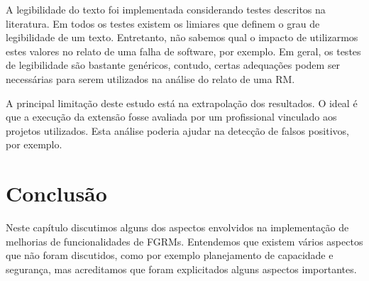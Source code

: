 A legibilidade do texto foi implementada considerando testes descritos na
literatura. Em todos os testes existem os limiares que definem o grau de
legibilidade de um texto. Entretanto, não sabemos qual o impacto de utilizarmos
estes valores no relato de uma falha de software, por exemplo. Em geral, os
testes de legibilidade são bastante genéricos, contudo, certas adequações podem
ser necessárias para serem utilizados na análise do relato de uma RM\@.

A principal limitação deste estudo está na extrapolação dos resultados. O ideal
é que a execução da extensão fosse avaliada por um profissional vinculado aos
projetos utilizados. Esta análise poderia ajudar na detecção de falsos
positivos, por exemplo.


\section{Conclusão}
\label{sec:implementacao_extensao_conclusao}

Neste capítulo discutimos alguns dos aspectos envolvidos na implementação de
melhorias de funcionalidades de FGRMs. Entendemos que existem vários aspectos
que não foram discutidos, como por exemplo planejamento de capacidade e
segurança, mas acreditamos que foram explicitados alguns aspectos importantes.

